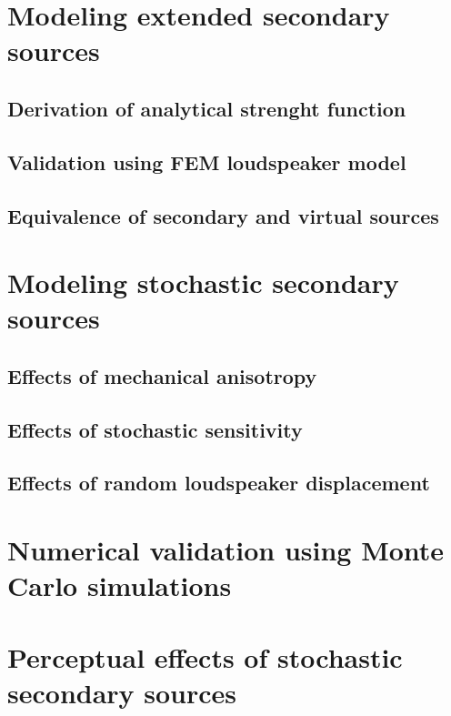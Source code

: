 \section{Modeling extended secondary sources}
%
\subsection{Derivation of analytical strenght function}
\subsection{Validation using FEM loudspeaker model}
\subsection{Equivalence of secondary and virtual sources}
%
%
\section{Modeling stochastic secondary sources}

\subsection{Effects of mechanical anisotropy}
\subsection{Effects of stochastic sensitivity}
\subsection{Effects of random loudspeaker displacement}

\section{Numerical validation using Monte Carlo simulations}

\section{Perceptual effects of stochastic secondary sources}